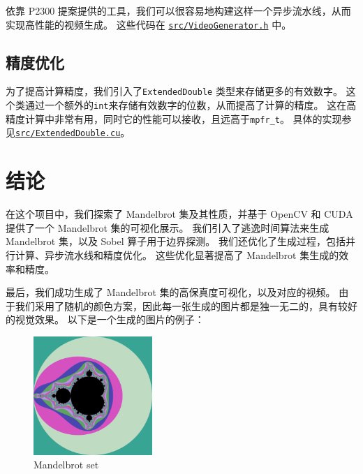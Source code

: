 \documentclass[11pt]{article}
\begin{document}
    依靠 P2300 提案提供的工具，我们可以很容易地构建这样一个异步流水线，从而实现高性能的视频生成。
    这些代码在 \href{https://github.com/AI1379/MandelbrotSet/blob/master/src/VideoGenerator.h}
    {\texttt{src/VideoGenerator.h}} 中。

    \subsection{精度优化}\label{subsec:precision-optimization}

    为了提高计算精度，我们引入了\texttt{ExtendedDouble} 类型来存储更多的有效数字。
    这个类通过一个额外的\texttt{int}来存储有效数字的位数，从而提高了计算的精度。
    这在高精度计算中非常有用，同时它的性能可以接收，且远高于\texttt{mpfr\_t}。
    具体的实现参见\href{https://github.com/AI1379/MandelbrotSet/blob/master/src/ExtendedDouble.cu}
    {\texttt{src/ExtendedDouble.cu}}。


    \section{结论}\label{sec:conclusion}

    在这个项目中，我们探索了 Mandelbrot 集及其性质，并基于 OpenCV 和 CUDA 提供了一个 Mandelbrot 集的可视化展示。
    我们引入了逃逸时间算法来生成 Mandelbrot 集，以及 Sobel 算子用于边界探测。
    我们还优化了生成过程，包括并行计算、异步流水线和精度优化。
    这些优化显著提高了 Mandelbrot 集生成的效率和精度。

    最后，我们成功生成了 Mandelbrot 集的高保真度可视化，以及对应的视频。
    由于我们采用了随机的颜色方案，因此每一张生成的图片都是独一无二的，具有较好的视觉效果。
    以下是一个生成的图片的例子：

    \begin{figure}[htbp]
        \label{fig:figure}
        \centering
        \includegraphics[width=0.4\textwidth]{MandelbrotSet}
        \caption{Mandelbrot set}
    \end{figure}

    
    
\end{document}
